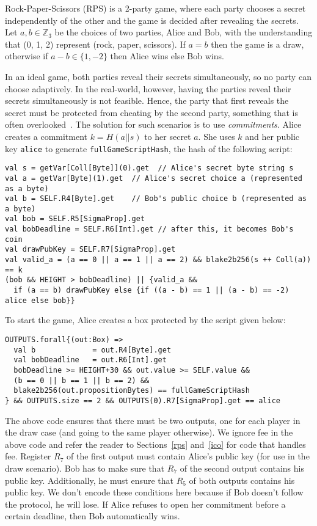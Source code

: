 \documentclass[runningheads]{llncs}
\begin{document}
Rock-Paper-Scissors (RPS) is a 2-party game, where each party chooses a secret independently of the other and the game is decided after revealing the secrets. 
Let $a, b\in \mathbb{Z}_3$ be the choices of two parties, Alice and Bob, with the understanding that (0, 1, 2) represent (rock, paper, scissors). If $a = b$ then the game is a draw, otherwise if $a-b \in \{1, -2\}$ then Alice wins else Bob wins. 

In an ideal game, both parties reveal their secrets simultaneously, so no party can choose adaptively. In the real-world, however, having the parties reveal their secrets simultaneously is not feasible. Hence, the party that first reveals the secret must be protected from cheating by the second party, something that is often overlooked~\cite{rps15}. The solution for such scenarios is to use {\em commitments}. 
Alice creates a commitment $k=H(a||s)$ to her secret $a$. She uses $k$ and her public key \texttt{alice} to generate \texttt{fullGameScriptHash}, the hash of the following script:
\small{
\begin{verbatim}
val s = getVar[Coll[Byte]](0).get  // Alice's secret byte string s
val a = getVar[Byte](1).get  // Alice's secret choice a (represented as a byte)
val b = SELF.R4[Byte].get    // Bob's public choice b (represented as a byte)
val bob = SELF.R5[SigmaProp].get
val bobDeadline = SELF.R6[Int].get // after this, it becomes Bob's coin
val drawPubKey = SELF.R7[SigmaProp].get
val valid_a = (a == 0 || a == 1 || a == 2) && blake2b256(s ++ Coll(a)) == k
(bob && HEIGHT > bobDeadline) || {valid_a &&
  if (a == b) drawPubKey else {if ((a - b) == 1 || (a - b) == -2) alice else bob}}
\end{verbatim}
}
To start the game, Alice creates a box protected by the script given below:
\small{
\begin{verbatim}
OUTPUTS.forall{(out:Box) =>
  val b             = out.R4[Byte].get
  val bobDeadline   = out.R6[Int].get
  bobDeadline >= HEIGHT+30 && out.value >= SELF.value &&
  (b == 0 || b == 1 || b == 2) && 
  blake2b256(out.propositionBytes) == fullGameScriptHash
} && OUTPUTS.size == 2 && OUTPUTS(0).R7[SigmaProp].get == alice 
\end{verbatim}
}

The above code ensures that there must be two outputs, one for each player in the draw case (and going to the same player otherwise). We ignore fee in the above code and refer the reader to Sections~\ref{rps} and~\ref{ico} for code that handles fee. Register $R_7$ of the first output must contain Alice's public key (for use in the draw scenario). Bob has to make sure that $R_7$ of the second output contains his public key. Additionally, he must ensure that $R_5$ of both outputs contains his public key. We don't encode these conditions here because if Bob doesn't follow the protocol, he will lose. If Alice refuses to open her commitment before a certain deadline, then Bob automatically wins. 
\end{document}
